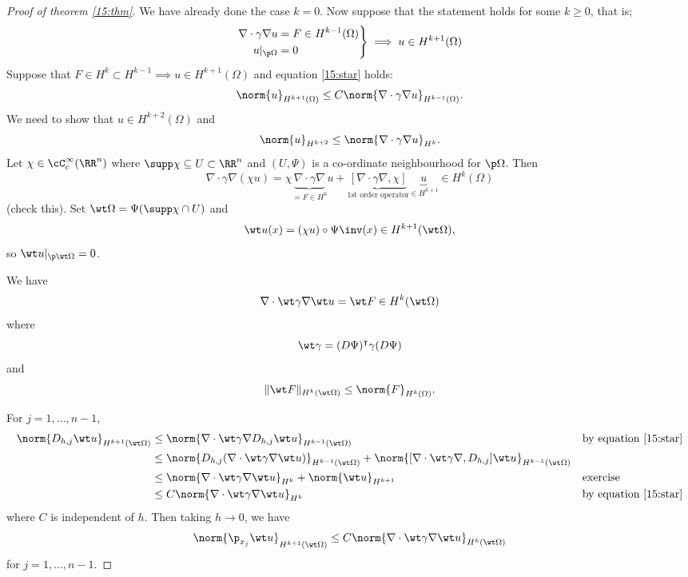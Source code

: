 \begin{proof}[Proof of theorem \ref{15:thm}]
  We have already done the case $k=0$.
  Now suppose that the statement holds for some $k\geq0$, that is;
  \begin{equation}
    \left.
    \begin{aligned}
      \nabla\cdot\gamma\nabla u &= F \in H^{k-1}(\Omega) \\
      u|_{\p\Omega} &= 0
    \end{aligned}
    \right\}\implies u\in H^{k+1}(\Omega)
    \label{<+label+>}
  \end{equation}
  Suppose that $F \in H^k \subset H^{k-1} \implies u \in H^{k+1}(\Omega)$ and equation \ref{15:star} holds:
  \begin{equation}
    \norm{u}_{H^{k+1}(\Omega)} \leq C\norm{\nabla\cdot\gamma\nabla u}_{H^{k-1}(\Omega)}.
    \label{15:star}
  \end{equation}
  We need to show that $u \in H^{k+2}(\Omega)$ and
  \[ \norm{u}_{H^{k+2}} \leq \norm{\nabla\cdot\gamma\nabla u}_{H^k}. \]
  Let $\chi\in\cC_c^\infty(\RR^n)$ where $\supp\chi\subseteq U\subset\RR^n$ and $(U,\Psi)$ is a co-ordinate neighbourhood for $\p\Omega$.
  Then
  \[ \nabla\cdot\gamma\nabla(\chi u) = \chi\underbrace{\nabla\cdot\gamma\nabla}_{=F \in H^k} u + \underbrace{[\nabla\cdot\gamma\nabla,\chi]}_{1\text{st order operator}}\underbrace{u}_{\in H^{k+1}} \in H^k(\Omega) \]
  (check this).
  Set $\wt\Omega=\Psi(\supp\chi\cap U)$ and 
  \[ \wt u(x) = (\chi u)\circ\Psi\inv(x) \in H^{k+1}(\wt\Omega), \]
  so $\wt u|_{\p\wt\Omega}=0$.

  \begin{exer}
    We have
    \[ \nabla\cdot\wt\gamma\nabla\wt u = \wt F \in H^k(\wt\Omega) \]
    where
    \[ \wt\gamma = (D\Psi)^\intercal \gamma (D\Psi) \]
    and
    \[ \Vert\wt F \Vert_{H^k(\wt\Omega)} \leq \norm{F}_{H^k(\Omega)}. \]
  \end{exer}

  For $j=1,\ldots,n-1$,
  \begin{align*}
    \norm{D_{h,j} \wt u}_{H^{k+1}(\wt\Omega)} &\leq \norm{\nabla\cdot\wt\gamma\nabla D_{h,j}\wt u}_{H^{k-1}(\wt\Omega)} && \text{by equation \ref{15:star}} \\
    &\leq \norm{D_{h,j}(\nabla\cdot\wt\gamma\nabla\wt u)}_{H^{k-1}(\wt\Omega)} + \norm{[\nabla\cdot\wt\gamma\nabla,D_{h,j}]\wt u}_{H^{k-1}(\wt\Omega)} \\
    &\leq \norm{\nabla\cdot\wt\gamma\nabla\wt u}_{H^k} + \norm{\wt u}_{H^{k+1}} && \text{exercise} \\
    &\leq C\norm{\nabla\cdot\wt\gamma\nabla\wt u}_{H^k} && \text{by equation \ref{15:star}}
  \end{align*}
  where $C$ is independent of $h$.
  Then taking $h\to0$, we have
  \begin{equation}
    \norm{\p_{x_j}\wt u}_{H^{k+1}(\wt\Omega)} \leq C\norm{\nabla\cdot\wt\gamma\nabla\wt u}_{H^k(\wt\Omega)}
    \label{15:2star}
  \end{equation}
  for $j=1,\ldots,n-1$.


\end{proof}
